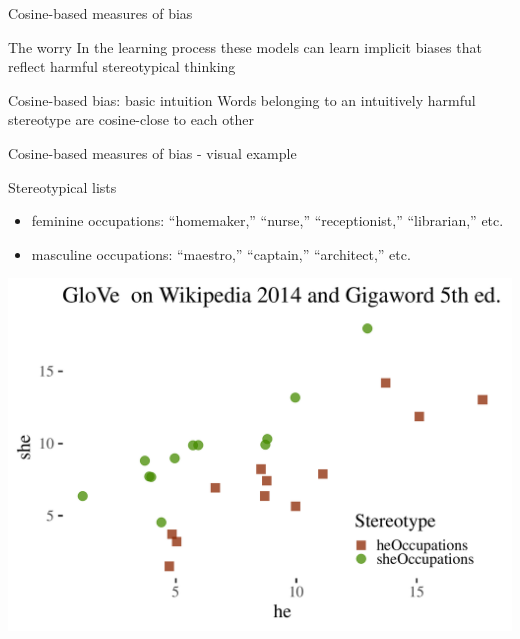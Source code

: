 \documentclass[
  10pt,
  ignorenonframetext,
  x11names, dvipsnames, bibspacing,natbib]{beamer}
\begin{document}
\begin{frame}{Cosine-based measures of bias}
\protect\hypertarget{cosine-based-measures-of-bias-2}{}
\begin{block}{The worry}
\protect\hypertarget{the-worry}{}
In the learning process these models can learn implicit biases that
reflect harmful stereotypical thinking

\pause
\end{block}

\begin{block}{Cosine-based bias: basic intuition}
\protect\hypertarget{cosine-based-bias-basic-intuition}{}
Words belonging to an intuitively harmful stereotype are cosine-close to
each other
\end{block}
\end{frame}

\begin{frame}{Cosine-based measures of bias - visual example}
\protect\hypertarget{cosine-based-measures-of-bias---visual-example}{}
\begin{block}{Stereotypical lists}
\protect\hypertarget{stereotypical-lists}{}
\footnotesize

\begin{itemize}
\item
  feminine occupations: ``homemaker,'' ``nurse,'' ``receptionist,''
  ``librarian,'' etc.
\item
  masculine occupations: ``maestro,'' ``captain,'' ``architect,'' etc.
\end{itemize}

\normalsize

\vspace{1mm}
\footnotesize

\begin{center}\includegraphics[width=0.6\linewidth]{presentationESSLLI_files/figure-beamer/unnamed-chunk-1-1} \end{center}
\normalsize
\end{block}
\end{frame}
\end{document}
